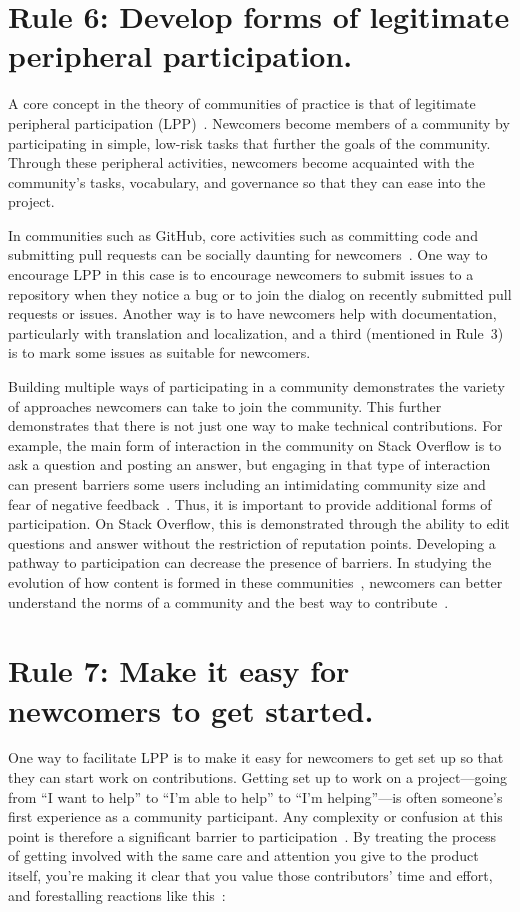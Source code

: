 \documentclass[10pt,letterpaper]{article}
\newcommand{\rulemajor}[1]{\section*{#1}}
\begin{document}
\rulemajor{Rule 6: Develop forms of legitimate peripheral participation.}

A core concept in the theory of communities of practice is that of
legitimate peripheral participation (LPP)~\cite{lave1991,wenger1999}.
Newcomers become members of a community by participating in simple, low-risk tasks
that further the goals of the community.
Through these peripheral activities,
newcomers become acquainted with the community's tasks, vocabulary, and governance
so that they can ease into the project.

In communities such as GitHub,
core activities such as committing code and submitting pull requests can be socially daunting for newcomers~\cite{steinmacher2015}.
One way to encourage LPP in this case is to encourage newcomers to submit issues to a repository when they notice a bug
or to join the dialog on recently submitted pull requests or issues.
Another way is to have newcomers help with documentation,
particularly with translation and localization,
and a third (mentioned in Rule~3) is to mark some issues as suitable for newcomers.

Building multiple ways of participating in a community demonstrates the variety of approaches newcomers can take to join the community.
This further demonstrates that there is not just one way to make technical contributions.
For example,
the main form of interaction in the community on Stack Overflow is to ask a question and posting an answer,
but engaging in that type of interaction can present barriers some users
including an intimidating community size and fear of negative feedback~\cite{ford2016}.
Thus, it is important to provide additional forms of participation.
On Stack Overflow, this is demonstrated through the ability to edit questions and answer without the restriction of reputation points.
Developing a pathway to participation can decrease the presence of barriers.
In studying the evolution of how content is formed in these communities~\cite{baltes2018},
newcomers can better understand the norms of a community and the best way to contribute~\cite{ford2018}.

\rulemajor{Rule 7: Make it easy for newcomers to get started.}

One way to facilitate LPP is to make it easy for newcomers to get set up
so that they can start work on contributions.
Getting set up to work on a project---going from ``I want to help''
to ``I'm able to help'' to ``I'm helping''---is often someone's first experience as a community participant.
Any complexity or confusion at this point is therefore a significant barrier to participation~\cite{steinmacher2014}.
By treating the process of getting involved with the same care and attention you give to the product itself,
you're making it clear that you value those contributors' time and effort,
and forestalling reactions like this~\cite{steinmacher2018b}:
\end{document}
